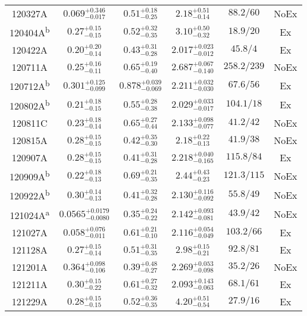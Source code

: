 \begin{center}
\begin{longtable}{cccccc}
120327A & $0.069^{+0.346}_{-0.017}$ & $0.51^{+0.18}_{-0.25}$ & $2.18^{+0.51}_{-0.14}$ & $88.2/60$ & NoEx\\[2pt] 
120404A\textsuperscript{b} & $0.27^{+0.15}_{-0.15}$ & $0.52^{+0.32}_{-0.35}$ & $3.10^{+0.50}_{-0.32}$ & $18.9/20$ & Ex\\[2pt] 
120422A & $0.20^{+0.20}_{-0.14}$ & $0.43^{+0.31}_{-0.28}$ & $2.017^{+0.023}_{-0.012}$ & $45.8/4$ & Ex\\[2pt] 
120711A & $0.25^{+0.16}_{-0.11}$ & $0.65^{+0.19}_{-0.40}$ & $2.687^{+0.067}_{-0.140}$ & $258.2/239$ & NoEx\\[2pt] 
120712A\textsuperscript{b} & $0.301^{+0.125}_{-0.099}$ & $0.878^{+0.039}_{-0.069}$ & $2.211^{+0.032}_{-0.030}$ & $67.6/56$ & Ex\\[2pt] 
120802A\textsuperscript{b} & $0.21^{+0.18}_{-0.15}$ & $0.55^{+0.28}_{-0.38}$ & $2.029^{+0.033}_{-0.017}$ & $104.1/18$ & Ex\\[2pt] 
120811C & $0.23^{+0.18}_{-0.14}$ & $0.65^{+0.27}_{-0.44}$ & $2.133^{+0.098}_{-0.077}$ & $41.2/42$ & NoEx\\[2pt] 
120815A & $0.28^{+0.15}_{-0.15}$ & $0.42^{+0.35}_{-0.30}$ & $2.18^{+0.22}_{-0.13}$ & $41.9/38$ & NoEx\\[2pt] 
120907A & $0.28^{+0.15}_{-0.15}$ & $0.41^{+0.31}_{-0.28}$ & $2.218^{+0.040}_{-0.165}$ & $115.8/84$ & Ex\\[2pt] 
120909A\textsuperscript{b} & $0.22^{+0.18}_{-0.13}$ & $0.69^{+0.21}_{-0.35}$ & $2.44^{+0.43}_{-0.23}$ & $121.3/115$ & NoEx\\[2pt] 
120922A\textsuperscript{b} & $0.30^{+0.14}_{-0.13}$ & $0.41^{+0.32}_{-0.28}$ & $2.130^{+0.116}_{-0.092}$ & $55.8/49$ & NoEx\\[2pt] 
121024A\textsuperscript{a} & $0.0565^{+0.0179}_{-0.0080}$ & $0.35^{+0.24}_{-0.22}$ & $2.142^{+0.093}_{-0.081}$ & $43.9/42$ & NoEx\\[2pt] 
121027A & $0.058^{+0.076}_{-0.011}$ & $0.61^{+0.21}_{-0.10}$ & $2.116^{+0.054}_{-0.049}$ & $103.2/66$ & Ex\\[2pt] 
121128A & $0.27^{+0.15}_{-0.14}$ & $0.51^{+0.31}_{-0.35}$ & $2.98^{+0.15}_{-0.21}$ & $92.8/81$ & Ex\\[2pt] 
121201A & $0.364^{+0.098}_{-0.106}$ & $0.39^{+0.48}_{-0.27}$ & $2.269^{+0.053}_{-0.098}$ & $35.2/26$ & NoEx\\[2pt] 
121211A & $0.30^{+0.15}_{-0.22}$ & $0.61^{+0.27}_{-0.32}$ & $2.093^{+0.143}_{-0.063}$ & $68.1/61$ & Ex\\[2pt] 
121229A & $0.28^{+0.15}_{-0.15}$ & $0.52^{+0.36}_{-0.35}$ & $4.20^{+0.51}_{-0.54}$ & $27.9/16$ & Ex\\[2pt] 
\end{longtable} 
\end{center}

